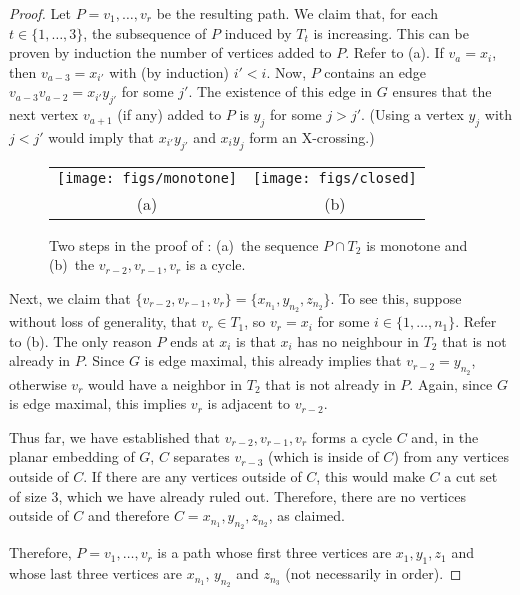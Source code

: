 \documentclass{patmorin}
\begin{document}
\begin{proof}
  Let $P=v_1,\ldots,v_r$ be the resulting path.  We claim that, for
  each $t\in \{1,\ldots,3\}$, the subsequence of $P$ induced by $T_t$
  is increasing. This can be proven by induction the number of vertices
  added to $P$. Refer to (a).  If $v_a=x_i$, then $v_{a-3}=x_{i'}$ with (by induction)
  $i'< i$.  Now, $P$ contains an edge $v_{a-3}v_{a-2}=x_{i'}y_{j'}$ for
  some $j'$.  The existence of this edge in $G$ ensures that the next
  vertex $v_{a+1}$ (if any) added to $P$ is $y_j$ for some $j > j'$.
  (Using a vertex $y_j$ with $j < j'$ would imply that $x_{i'}y_{j'}$
  and $x_iy_j$ form an X-crossing.)

  \begin{figure}
    \begin{center}
       \begin{tabular}{cc}
         \texttt{[image: figs/monotone]} & \texttt{[image: figs/closed]} \\
         (a) & (b)
       \end{tabular}
    \end{center}
    \caption{Two steps in the proof of : (a)~the sequence $P\cap T_2$ is monotone and (b)~the $v_{r-2},v_{r-1},v_r$ is a cycle.}
  \end{figure}


  Next, we claim that
  $\{v_{r-2},v_{r-1},v_{r}\}=\{x_{n_1},y_{n_2},z_{n_2}\}$. To see this,
  suppose without loss of generality, that $v_r\in T_1$, so $v_r=x_i$
  for some $i\in\{1,\ldots,n_1\}$. Refer to (b). The only
  reason $P$ ends at $x_i$ is that $x_i$ has no neighbour in $T_{2}$
  that is not already in $P$.  Since $G$ is edge maximal, this already
  implies that $v_{r-2}=y_{n_2}$, otherwise $v_r$ would have a neighbor
  in $T_2$ that is not already in $P$.  Again, since $G$ is edge maximal,
  this implies $v_r$ is adjacent to $v_{r-2}$.


  Thus far, we have established that $v_{r-2},v_{r-1},v_{r}$ forms a
  cycle $C$ and, in the planar embedding of $G$, $C$ separates $v_{r-3}$
  (which is inside of $C$) from any vertices outside of $C$.  If there
  are any vertices outside of $C$, this would make $C$ a cut set of size
  3, which we have already ruled out. Therefore, there are no vertices
  outside of $C$ and therefore $C=x_{n_1},y_{n_2},z_{n_2}$, as claimed.

  Therefore, $P=v_1,\ldots,v_r$ is a path whose first three vertices are
  $x_1,y_1,z_1$ and whose last three vertices are $x_{n_1}$, $y_{n_2}$
  and $z_{n_3}$ (not necessarily in order).


\end{proof}
\end{document}
